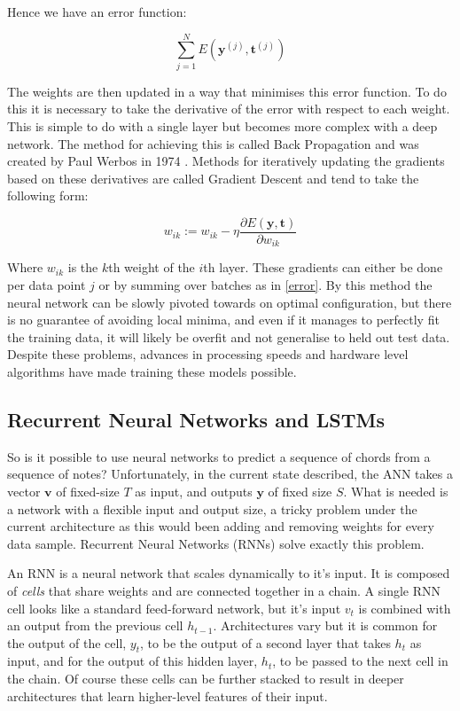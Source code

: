 \documentclass[bsc,singlespacing,logo, parskip, deptreport]{infthesis}
\begin{document}
Hence we have an error function:

\begin{equation}
  \label{error}
  \sum_{j = 1}^{N} E(\bm{y}^{(j)}, \bm{t}^{(j)})
\end{equation}

The weights are then updated in a way that minimises this error function. To do this it is necessary to take the derivative of the error with respect to each weight. This is simple to do with a single layer but becomes more complex with a deep network. The method for achieving this is called Back Propagation and was created by Paul Werbos in 1974 \cite{werbos_1974}. Methods for iteratively updating the gradients based on these derivatives are called Gradient Descent and tend to take the following form:

\begin{equation}
  w_{ik} := w_{ik} - \eta \frac{\partial E(\bm{y}, \bm{t})}{\partial w_{ik}}
\end{equation}

Where $w_{ik}$ is the $k$th weight of the $i$th layer. These gradients can either be done per data point $j$ or by summing over batches as in \ref{error}. By this method the neural network can be slowly pivoted towards on optimal configuration, but there is no guarantee of avoiding local minima, and even if it manages to perfectly fit the training data, it will likely be overfit and not generalise to held out test data. Despite these problems, advances in processing speeds and hardware level algorithms \cite{kruger2003linear} have made training these models possible.

\subsection{Recurrent Neural Networks and LSTMs}

So is it possible to use neural networks to predict a sequence of chords from a sequence of notes? Unfortunately, in the current state described, the ANN takes a vector $\bm{v}$ of fixed-size $T$ as input, and outputs $\bm{y}$ of fixed size $S$. What is needed is a network with a flexible input and output size, a tricky problem under the current architecture as this would been adding and removing weights for every data sample. Recurrent Neural Networks (RNNs) solve exactly this problem.

An RNN is a neural network that scales dynamically to it's input. It is composed of {\em cells} that share weights and are connected together in a chain. A single RNN cell looks like a standard feed-forward network, but it's input $v_t$ is combined with an output from the previous cell $h_{t-1}$. Architectures vary but it is common for the output of the cell, $y_t$, to be the output of a second layer that takes $h_t$ as input, and for the output of this hidden layer, $h_t$, to be passed to the next cell in the chain. Of course these cells can be further stacked to result in deeper architectures that learn higher-level features of their input.
\end{document}
